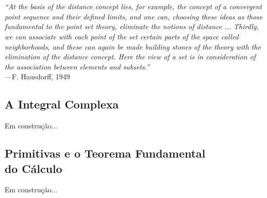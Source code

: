 \chapter[Semana 7]{}
\chaptermark{}


\hfill%
\begin{minipage}{12cm}
	\begin{flushright}
		\rightskip=0.5cm
		\textit{``At the basis of the distance concept lies, for example, 
		the concept of a convergent point sequence and their defined limits,
		and one can, choosing these ideas as those fundamental to the point 
		set theory, eliminate the notions of distance ... Thirdly, 
		we can associate with each point of the set certain parts of the space
		called neighborhoods, and these can again be made building stones of the 
		theory with the elimination of the distance concept. Here the view
		of a set is in consideration of the association between elements and
		subsets.''}
		\\[0.1cm]
		\rightskip=0.5cm
		---F. Hausdorff, 1949
	\end{flushright}
\end{minipage}



\section{A Integral Complexa}
\begin{center}
Em construção...
\end{center}




\section[Primitivas e o Teorema Fundamental do Cálculo]
{Primitivas e o Teorema Fundamental\\ do Cálculo}
\begin{center}
Em construção...
\end{center}


